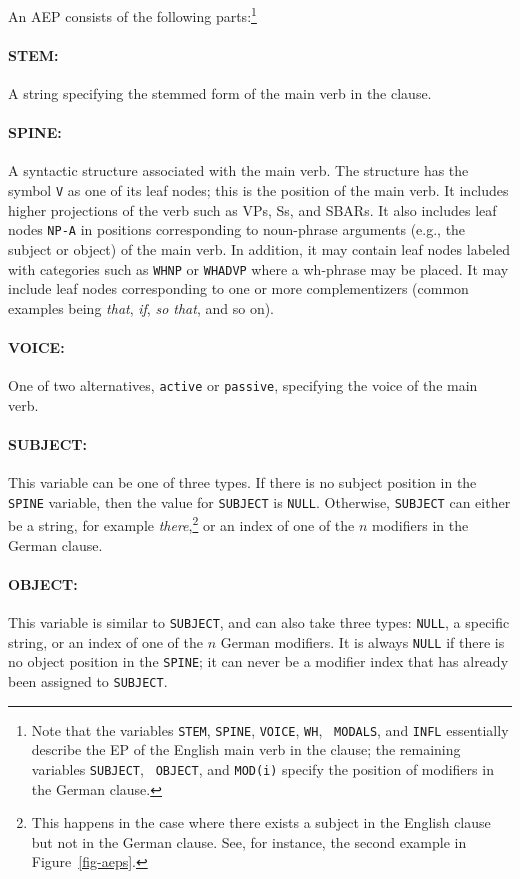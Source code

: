 \documentclass[11pt]{report}
\theoremstyle{plain}
\begin{document}
{An AEP consists of the following parts:\footnote{Note that the
variables {\tt STEM}, {\tt SPINE}, {\tt VOICE}, {\tt WH}, {\tt
MODALS}, and {\tt INFL} essentially describe the EP of the English
main verb in the clause; the remaining variables {\tt SUBJECT}, {\tt
OBJECT}, and {\tt MOD(i)} specify the position of modifiers in the
German clause.}

\paragraph{STEM:} A string specifying the stemmed form of the
main verb in the clause.

\paragraph{SPINE:} A syntactic structure associated with the main verb. 
  The structure has the symbol {\tt V} as one of its leaf nodes; this
  is the position of the main verb. It includes higher projections of
  the verb such as VPs, Ss, and SBARs. It also includes leaf nodes
  {\tt NP-A} in positions corresponding to noun-phrase arguments
  (e.g., the subject or object) of the main verb. In addition, it may
  contain leaf nodes labeled with categories such as {\tt WHNP} or
  {\tt WHADVP} where a wh-phrase may be placed. It may include leaf
  nodes corresponding to one or more complementizers (common examples
  being {\em that}, {\em if}, {\em so that}, and so on).

\paragraph{VOICE:} One of two alternatives, {\tt active} or 
{\tt passive}, specifying the voice of the main verb.

\paragraph{SUBJECT:} This variable can be one of three types. If there
is no subject position in the {\tt SPINE} variable, then the value for
{\tt SUBJECT} is {\tt NULL}. Otherwise, {\tt SUBJECT} can either be a
string, for example {\em there},\footnote{This happens in the case
where there exists a subject in the English clause but not in the
German clause. See, for instance, the second example in
Figure~\ref{fig-aeps}.} or an index of one of the $n$ modifiers in the
German clause.

\paragraph{OBJECT:} This variable is similar to {\tt SUBJECT}, and can
also take three types: {\tt NULL}, a specific string, or an index of
one of the $n$ German modifiers. It is always {\tt NULL} if there is
no object position in the {\tt SPINE}; it can never be a modifier
index that has already been assigned to {\tt SUBJECT}.

}
\end{document}
